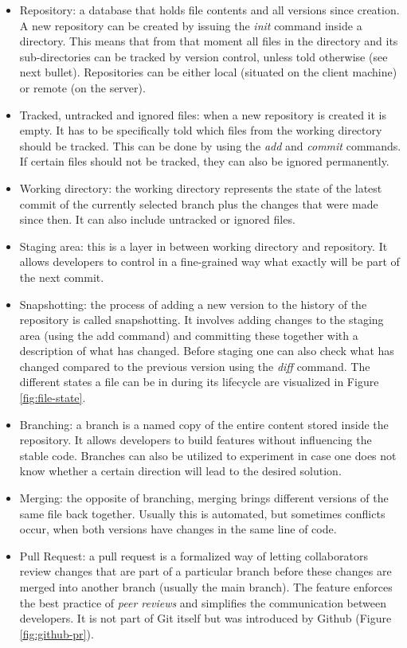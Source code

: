 \begin{itemize}
  \item Repository: a database that holds file contents and all versions since creation. A new repository can be created by issuing the \textit{init} command inside a directory. This means that from that moment all files in the directory and its sub-directories can be tracked by version control, unless told otherwise (see next bullet). Repositories can be either local (situated on the client machine) or remote (on the server).
  \item Tracked, untracked and ignored files: when a new repository is created it is empty. It has to be specifically told which files from the working directory should be tracked. This can be done by using the \textit{add} and \textit{commit} commands. If certain files should not be tracked, they can also be ignored permanently.
  \item Working directory: the working directory represents the state of the latest commit of the currently selected branch plus the changes that were made since then. It can also include untracked or ignored files.
  \item Staging area: this is a layer in between working directory and repository. It allows developers to control in a fine-grained way what exactly will be part of the next commit.
  \item Snapshotting: the process of adding a new version to the history of the repository is called snapshotting. It involves adding changes to the staging area (using the add command) and committing these together with a description of what has changed.  Before staging one can also check what has changed compared to the previous version using the \textit{diff} command. The different states a file can be in during its lifecycle are visualized in Figure \ref{fig:file-state}.
  \item Branching: a branch is a named copy of the entire content stored inside the repository. It allows developers to build features without influencing the stable code. Branches can also be utilized to experiment in case one does not know whether a certain direction will lead to the desired solution.
  \item Merging: the opposite of branching, merging brings different versions of the same file back together. Usually this is automated, but sometimes conflicts occur, when both versions have changes in the same line of code.
  \item Pull Request: a pull request is a formalized way of letting collaborators review changes that are part of a particular branch before these changes are merged into another branch (usually the main branch). The feature enforces the best practice of \textit{peer reviews} and simplifies the communication between developers. It is not part of Git itself but was introduced by Github (Figure \ref{fig:github-pr}).
\end{itemize}


